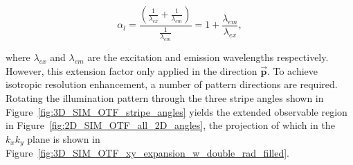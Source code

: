 \begin{equation}\label{eq:lateral_res_extension_factor}
\alpha_{l} = \frac{\left(\frac{1}{\lambda_{ex}} + \frac{1}{\lambda_{em}}\right)}{\frac{1}{\lambda_{em}}} = 1 + \frac{\lambda_{em}}{\lambda_{ex}},
\end{equation}

where $\lambda_{ex}$ and $\lambda_{em}$ are the excitation and emission
wavelengths respectively.  However, this extension factor only applied in 
the direction $\overrightarrow{\textbf{p}}$. To achieve isotropic 
resolution enhancement, a number of pattern directions are required. 
Rotating the illumination pattern through the three stripe angles shown 
in Figure~\ref{fig:3D_SIM_OTF_stripe_angles} yields the extended 
observable region in Figure~\ref{fig:2D_SIM_OTF_all_2D_angles}, the 
projection of which in the $k_{x}k_{y}$ plane is shown in
Figure~\ref{fig:3D_SIM_OTF_xy_expansion_w_double_rad_filled}. 

